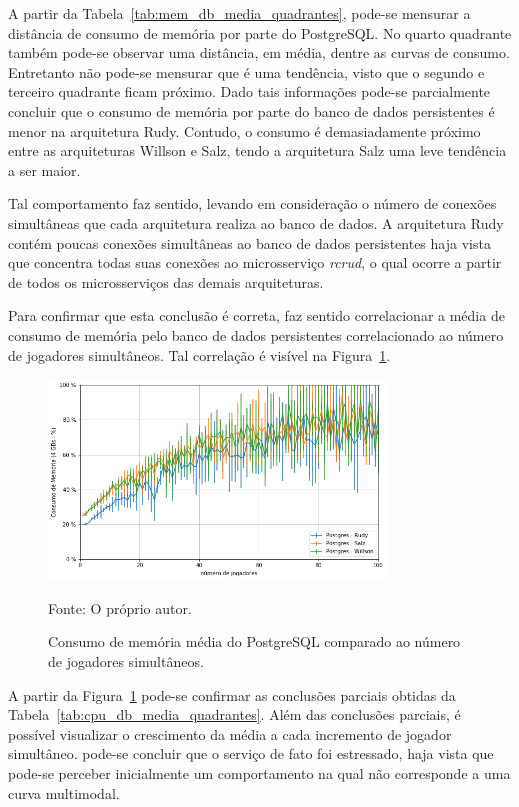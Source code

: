 A partir da Tabela~\ref{tab:mem_db_media_quadrantes}, pode-se mensurar a distância de consumo de memória por parte do PostgreSQL.
%
No quarto quadrante também pode-se observar uma distância, em média, dentre as curvas de consumo.
%
Entretanto não pode-se mensurar que é uma tendência, visto que o segundo e terceiro quadrante ficam próximo.
%
Dado tais informações pode-se parcialmente concluir que o consumo de memória por parte do banco de dados persistentes é menor na arquitetura Rudy.
%
Contudo, o consumo é demasiadamente próximo entre as arquiteturas Willson e Salz, tendo a arquitetura Salz uma leve tendência a ser maior.

Tal comportamento faz sentido, levando em consideração o número de conexões simultâneas que cada arquitetura realiza ao banco de dados.
%
A arquitetura Rudy contém poucas conexões simultâneas ao banco de dados persistentes haja vista que concentra todas suas conexões ao microsserviço \textit{rcrud}, o qual ocorre a partir de todos os microsserviços das demais arquiteturas.

Para confirmar que esta conclusão é correta, faz sentido correlacionar a média de consumo de memória pelo banco de dados persistentes correlacionado ao número de jogadores simultâneos.
%
Tal correlação é visível na Figura~\ref{fig:mem_db_media_por_jogador}.

\begin{figure}[htb!]
  \caption{Consumo de memória média do PostgreSQL comparado ao número de jogadores simultâneos.}
  \label{fig:mem_db_media_por_jogador}
  \includegraphics[width=0.8\textwidth]{figuras/analise/mem_db_media_por_jogador.png}
  \centering

  Fonte: O próprio autor.
\end{figure}

A partir da Figura~\ref{fig:mem_db_media_por_jogador} pode-se confirmar as conclusões parciais obtidas da Tabela~\ref{tab:cpu_db_media_quadrantes}.
%
Além das conclusões parciais, é possível visualizar o crescimento da média a cada incremento de jogador simultâneo.
%
pode-se concluir que o serviço de fato foi estressado, haja vista que pode-se perceber inicialmente um comportamento na qual não corresponde a uma curva multimodal.

